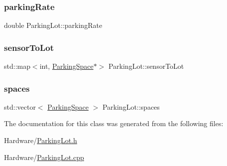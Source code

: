 \subsubsection{\texorpdfstring{parking\+Rate}{parkingRate}}
{\footnotesize\ttfamily double Parking\+Lot\+::parking\+Rate\hspace{0.3cm}{\ttfamily [private]}}

\mbox{\label{class_parking_lot_a238562d70b99f294898ddf21972d51c3}} 
\subsubsection{\texorpdfstring{sensor\+To\+Lot}{sensorToLot}}
{\footnotesize\ttfamily std\+::map$<$int, \mbox{\hyperlink{class_parking_space}{Parking\+Space}}$\ast$$>$ Parking\+Lot\+::sensor\+To\+Lot\hspace{0.3cm}{\ttfamily [private]}}

\mbox{\label{class_parking_lot_ab4e93d05c1bb85849504c26cb12a6813}} 
\subsubsection{\texorpdfstring{spaces}{spaces}}
{\footnotesize\ttfamily std\+::vector$<$ \mbox{\hyperlink{class_parking_space}{Parking\+Space}} $>$ Parking\+Lot\+::spaces\hspace{0.3cm}{\ttfamily [private]}}



The documentation for this class was generated from the following files\+:\begin{DoxyCompactItemize}
\item 
Hardware/\mbox{\hyperlink{_hardware_2_parking_lot_8h}{Parking\+Lot.\+h}}\item 
Hardware/\mbox{\hyperlink{_parking_lot_8cpp}{Parking\+Lot.\+cpp}}\end{DoxyCompactItemize}
